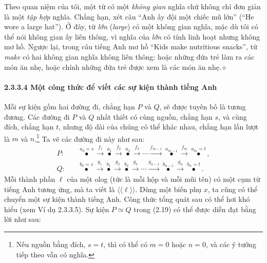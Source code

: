 Theo quan niệm của tôi, một từ có một \emph{không gian} nghĩa chứ không chỉ đơn giản là một \emph{tập hợp} nghĩa. Chẳng hạn, xét câu ``Anh ấy đội một chiếc mũ lớn'' (``He wore a large hat''). Ở đây, từ \emph{lớn} (\emph{large}) có một không gian nghĩa, mặc dù tôi có thể nói không gian ấy liên thông, vì nghĩa của \emph{lớn} có tính linh hoạt nhưng không mơ hồ. Ngược lại, trong câu tiếng Anh mơ hồ ``Kids make nutritious snacks'', từ \emph{make} có hai không gian nghĩa không liên thông: hoặc những đứa trẻ làm ra các món ăn nhẹ, hoặc chính những đứa trẻ được xem là các món ăn nhẹ.\hfill$\diamond$
\paragraph{2.3.3.4 Một công thức để viết các sự kiện thành tiếng Anh}
Mỗi sự kiện gồm hai đường đi, chẳng hạn $P$ và $Q$, sẽ được tuyên bố là tương đương. Các đường đi $P$ và $Q$ nhất thiết có cùng nguồn, chẳng hạn $s$, và cùng đích, chẳng hạn $t$, nhưng độ dài của chúng có thể khác nhau, chẳng hạn lần lượt là $m$ và $n$.\footnote{Nếu nguồn bằng đích, $s=t$, thì có thể có $m=0$ hoặc $n=0$, và các ý tưởng tiếp theo vẫn có nghĩa.} Ta vẽ các đường đi này như sau:
\begin{equation*}\begin{aligned}
P:\quad&\overset{a_0=s}{\bullet}\xrightarrow{f_1}\overset{a_1}{\bullet}\xrightarrow{f_2}\overset{a_2}{\bullet}\xrightarrow{f_3}\cdots\xrightarrow{f_{m-1}}\overset{a_{m-1}}{\bullet}\xrightarrow{f_m}\overset{a_m=t}{\bullet},\\[6pt]
Q:\quad&\overset{b_0=s}{\bullet}\xrightarrow{g_1}\overset{b_1}{\bullet}\xrightarrow{g_2}\overset{b_2}{\bullet}\xrightarrow{g_3}\cdots\xrightarrow{g_{n-1}}\overset{b_{n-1}}{\bullet}\xrightarrow{g_n}\overset{b_n=t}{\bullet}.
\end{aligned}\tag{2.19}\end{equation*}
Mỗi thành phần $\ell$ của một olog (tức là mỗi hộp và mỗi mũi tên) có một cụm từ tiếng Anh tương ứng, mà ta viết là $\langle\!\langle\ell\rangle\!\rangle$. Dùng một biến phụ $x$, ta cũng có thể chuyển một sự kiện thành tiếng Anh. Công thức tổng quát sau có thể hơi khó hiểu (xem Ví dụ 2.3.3.5). Sự kiện $P\simeq Q$ trong (2.19) có thể được diễn đạt bằng lời như sau:
